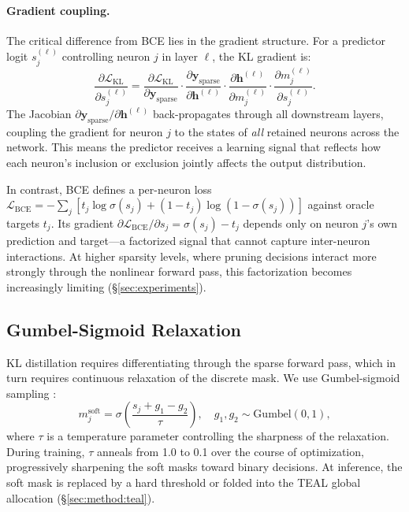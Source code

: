 \paragraph{Gradient coupling.}
The critical difference from BCE lies in the gradient structure.
For a predictor logit $s_j^{(\ell)}$ controlling neuron $j$ in layer $\ell$, the KL gradient is:
\begin{equation}
\frac{\partial \mathcal{L}_{\text{KL}}}{\partial s_j^{(\ell)}} = \frac{\partial \mathcal{L}_{\text{KL}}}{\partial \mathbf{y}_{\text{sparse}}} \cdot \frac{\partial \mathbf{y}_{\text{sparse}}}{\partial \mathbf{h}^{(\ell)}} \cdot \frac{\partial \mathbf{h}^{(\ell)}}{\partial m_j^{(\ell)}} \cdot \frac{\partial m_j^{(\ell)}}{\partial s_j^{(\ell)}}.
\label{eq:kl_gradient}
\end{equation}
The Jacobian $\partial \mathbf{y}_{\text{sparse}} / \partial \mathbf{h}^{(\ell)}$ back-propagates through all downstream layers, coupling the gradient for neuron $j$ to the states of \emph{all} retained neurons across the network.
This means the predictor receives a learning signal that reflects how each neuron's inclusion or exclusion jointly affects the output distribution.

In contrast, BCE defines a per-neuron loss $\mathcal{L}_{\text{BCE}} = -\sum_j [t_j \log \sigma(s_j) + (1{-}t_j)\log(1{-}\sigma(s_j))]$ against oracle targets $t_j$.
Its gradient $\partial \mathcal{L}_{\text{BCE}} / \partial s_j = \sigma(s_j) - t_j$ depends only on neuron $j$'s own prediction and target---a factorized signal that cannot capture inter-neuron interactions.
At higher sparsity levels, where pruning decisions interact more strongly through the nonlinear forward pass, this factorization becomes increasingly limiting (\S\ref{sec:experiments}).

\subsection{Gumbel-Sigmoid Relaxation}
\label{sec:method:gumbel}

KL distillation requires differentiating through the sparse forward pass, which in turn requires continuous relaxation of the discrete mask.
We use Gumbel-sigmoid sampling \cite{placeholder_gumbel}:
\begin{equation}
m_j^{\text{soft}} = \sigma\!\left(\frac{s_j + g_1 - g_2}{\tau}\right), \quad g_1, g_2 \sim \text{Gumbel}(0,1),
\label{eq:gumbel}
\end{equation}
where $\tau$ is a temperature parameter controlling the sharpness of the relaxation.
During training, $\tau$ anneals from 1.0 to 0.1 over the course of optimization, progressively sharpening the soft masks toward binary decisions.
At inference, the soft mask is replaced by a hard threshold or folded into the TEAL global allocation (\S\ref{sec:method:teal}).


